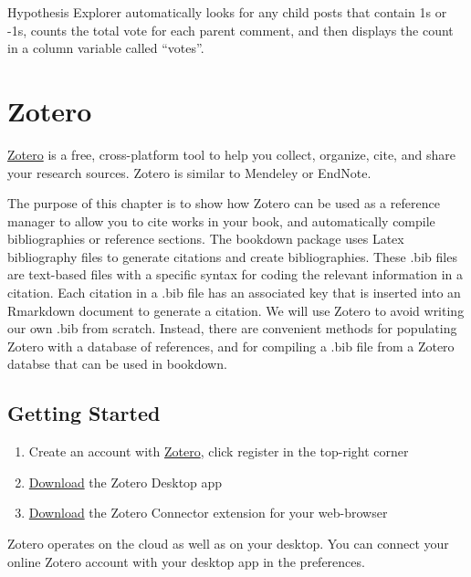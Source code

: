 \documentclass[
]{book}
\providecommand{\tightlist}{%
  \setlength{\itemsep}{0pt}\setlength{\parskip}{0pt}}
\begin{document}
Hypothesis Explorer automatically looks for any child posts that contain 1s or -1s, counts the total vote for each parent comment, and then displays the count in a column variable called ``votes''.

\hypertarget{zotero-1}{%
\chapter{Zotero}\label{zotero-1}}

\href{https://www.zotero.org}{Zotero} is a free, cross-platform tool to help you collect, organize, cite, and share your research sources. Zotero is similar to Mendeley or EndNote.

The purpose of this chapter is to show how Zotero can be used as a reference manager to allow you to cite works in your book, and automatically compile bibliographies or reference sections. The bookdown package uses Latex bibliography files to generate citations and create bibliographies. These .bib files are text-based files with a specific syntax for coding the relevant information in a citation. Each citation in a .bib file has an associated key that is inserted into an Rmarkdown document to generate a citation. We will use Zotero to avoid writing our own .bib from scratch. Instead, there are convenient methods for populating Zotero with a database of references, and for compiling a .bib file from a Zotero databse that can be used in bookdown.

\hypertarget{getting-started-1}{%
\section{Getting Started}\label{getting-started-1}}

\begin{enumerate}
\def\labelenumi{\arabic{enumi}.}
\tightlist
\item
  Create an account with \href{https://www.zotero.org}{Zotero}, click register in the top-right corner
\item
  \href{https://www.zotero.org/download/}{Download} the Zotero Desktop app
\item
  \href{https://www.zotero.org/download/}{Download} the Zotero Connector extension for your web-browser
\end{enumerate}

Zotero operates on the cloud as well as on your desktop. You can connect your online Zotero account with your desktop app in the preferences.
\end{document}
